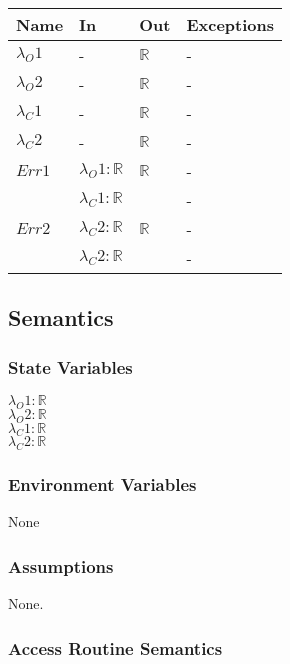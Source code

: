 \documentclass[12pt, titlepage]{article}
\begin{document}
\begin{center}
	\begin{tabular}{p{3cm} p{6cm} p{3cm} >{\raggedright\arraybackslash}p{3cm}}
		\toprule
		\textbf{Name} & \textbf{In} & \textbf{Out} & \textbf{Exceptions} \\
		\hline
		$\lambda_O1$ & - & $\mathbb{R}$ & - \\
		$\lambda_O2$ & - & $\mathbb{R}$ & - \\ 
		$\lambda_C1$ & - & $\mathbb{R}$ & - \\
		$\lambda_C2$ & - & $\mathbb{R}$ & - \\
		$Err1$ & $\lambda_O1 : \mathbb{R}$ & $\mathbb{R}$ &- \\
		 & $\lambda_C1 : \mathbb{R}$ &  &- \\
		$Err2$ & $\lambda_C2 : \mathbb{R}$ & $\mathbb{R}$ &- \\
		 & $\lambda_C2 : \mathbb{R}$ &  &- \\
		\hline
	\end{tabular}
\end{center}

\subsection{Semantics}

\subsubsection{State Variables}

$\lambda_O1 : \mathbb{R}$ \\
$\lambda_O2 : \mathbb{R}$ \\
$\lambda_C1 : \mathbb{R}$ \\ 
$\lambda_C2 : \mathbb{R}$

\subsubsection{Environment Variables}

None

\subsubsection{Assumptions}


	None.

\subsubsection{Access Routine Semantics}
\end{document}
